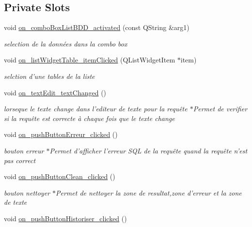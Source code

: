 \subsection*{Private Slots}
\begin{DoxyCompactItemize}
\item 
void \hyperlink{class_main_window_a7d0e1b08003371dc8ff793d6b5486922}{on\-\_\-combo\-Box\-List\-B\-D\-D\-\_\-activated} (const Q\-String \&arg1)
\begin{DoxyCompactList}\small\item\em selection de la données dans la combo box \end{DoxyCompactList}\item 
void \hyperlink{class_main_window_a7a5503fe944b455e6c28f40ef5fa2200}{on\-\_\-list\-Widget\-Table\-\_\-item\-Clicked} (Q\-List\-Widget\-Item $\ast$item)
\begin{DoxyCompactList}\small\item\em selction d'une tables de la liste \end{DoxyCompactList}\item 
void \hyperlink{class_main_window_a6c58d1c698cb819af30fd5c2e8aefcf0}{on\-\_\-text\-Edit\-\_\-text\-Changed} ()
\begin{DoxyCompactList}\small\item\em lorseque le texte change dans l'editeur de texte pour la requête $\ast$\-Permet de verifier si la requête est correcte à chaque fois que le texte change \end{DoxyCompactList}\item 
void \hyperlink{class_main_window_ad2b7c5e0d452224c1ef4f9ee2d093f07}{on\-\_\-push\-Button\-Erreur\-\_\-clicked} ()
\begin{DoxyCompactList}\small\item\em bouton erreur $\ast$\-Permet d'afficher l'erreur S\-Q\-L de la requête quand la requête n'est pas correct \end{DoxyCompactList}\item 
void \hyperlink{class_main_window_a8ba1fa24949d7a52ddac98b8723819a0}{on\-\_\-push\-Button\-Clean\-\_\-clicked} ()
\begin{DoxyCompactList}\small\item\em bouton nettoyer $\ast$\-Permet de nettoyer la zone de resultat,zone d'erreur et la zone de texte \end{DoxyCompactList}\item 
void \hyperlink{class_main_window_aa8a14a7ebcd9224ebf3af3f468d831b1}{on\-\_\-push\-Button\-Historiser\-\_\-clicked} ()

\end{DoxyCompactItemize}
